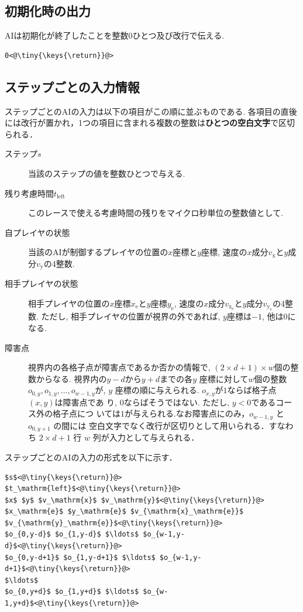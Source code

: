 \documentclass[11pt]{jarticle}
\begin{document}
\subsection{初期化時の出力}\label{sec:output_init}
AIは初期化が終了したことを整数$0$ひとつ及び改行で伝える.

\begin{lstlisting}
0<@\tiny{\keys{\return}}@>
\end{lstlisting}

\subsection{ステップごとの入力情報}
ステップごとのAIの入力は以下の項目がこの順に並ぶものである.
各項目の直後には改行が置かれ，1つの項目に含まれる複数の整数は{\bf ひとつの空白文字}で区切られる．

\begin{description}
\item[ステップ$s$] 当該のステップの値を整数ひとつで与える.
\item[残り考慮時間$t_\mathrm{left}$] このレースで使える考慮時間の残りをマイクロ秒単位の整数値として.
\item[自プレイヤの状態] 当該のAIが制御するプレイヤの位置の$x$座標と$y$座標, 速度の$x$成分$v_\mathrm{x}$と$y$成分$v_\mathrm{y}$の4整数.
\item[相手プレイヤの状態] 相手プレイヤの位置の$x$座標$x_\mathrm{e}$と$y$座標$y_\mathrm{e}$, 速度の$x$成分$v_{\mathrm{x}_\mathrm{e}}$と$y$成分$v_{\mathrm{y}_\mathrm{e}}$の4整数.
  ただし, 相手プレイヤの位置が視界の外であれば, $y$座標は$-1$, 他は$0$になる.
\item[障害点] 視界内の各格子点が障害点であるか否かの情報で,
  $(2\times d+1)\times w$個の整数からなる. 視界内の$y-d$から$y+d$までの各$y$
  座標に対して$w$個の整数$o_{0,y}, o_{1,y}, \ldots, o_{w-1,y}$が, $y$
  座標の順に与えられる.  $o_{x,y}$が$1$ならば格子点$(x,y)$は障害点であ
  り, $0$ならばそうではない.  ただし, $y<0$であるコース外の格子点につ
  いては$1$が与えられる.なお障害点にのみ，$o_{w-1,y}$ と $o_{0,y+1}$ の間には
  空白文字でなく改行が区切りとして用いられる．すなわち $2\times d+1$ 行 $w$ 列が入力として与えられる．
\end{description}

ステップごとのAIの入力の形式を以下に示す．
\begin{lstlisting}
$s$<@\tiny{\keys{\return}}@>
$t_\mathrm{left}$<@\tiny{\keys{\return}}@>
$x$ $y$ $v_\mathrm{x}$ $v_\mathrm{y}$<@\tiny{\keys{\return}}@>
$x_\mathrm{e}$ $y_\mathrm{e}$ $v_{\mathrm{x}_\mathrm{e}}$ $v_{\mathrm{y}_\mathrm{e}}$<@\tiny{\keys{\return}}@>
$o_{0,y-d}$ $o_{1,y-d}$ $\ldots$ $o_{w-1,y-d}$<@\tiny{\keys{\return}}@>
$o_{0,y-d+1}$ $o_{1,y-d+1}$ $\ldots$ $o_{w-1,y-d+1}$<@\tiny{\keys{\return}}@>
$\ldots$
$o_{0,y+d}$ $o_{1,y+d}$ $\ldots$ $o_{w-1,y+d}$<@\tiny{\keys{\return}}@>
\end{lstlisting}
\end{document}
